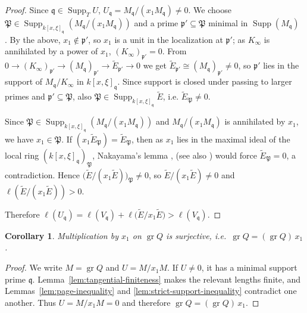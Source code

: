 \documentclass[pdflatex,sn-mathphys-num]{sn-jnl}
\numberwithin{equation}{section}
\theoremstyle{thmstyleone}
\newtheorem{corollary}[theorem]{Corollary}
\theoremstyle{thmstyletwo}
\newcommand{\gr}{\operatorname{gr}}
\begin{document}
\begin{proof}
Since $\mathfrak q\in\operatorname{Supp}_TU$,
$U_{\mathfrak q}=M_{\mathfrak q}/({x_1}M_{\mathfrak q})\ne0$. We choose $\mathfrak P\in\operatorname{Supp}_{k[x,\xi]_{\mathfrak q}}(M_{\mathfrak q}/({x_1}M_{\mathfrak q}))$
and a prime $\mathfrak p'\subseteq\mathfrak P$ minimal in $\operatorname{Supp}(M_{\mathfrak q})$ \cite[Tag 00E0]{Stacks}. By the above, ${x_1}\notin\mathfrak p'$, so ${x_1}$ is a unit in the localization at $\mathfrak p'$; as $K_{\infty}$ is annihilated by a power of ${x_1}$, $(K_{\infty})_{\mathfrak p'}=0$. From
$0\to (K_{\infty})_{\mathfrak p'}\to (M_{\mathfrak q})_{\mathfrak p'}\to \tilde E_{\mathfrak p'}\to0$ we get
$\tilde E_{\mathfrak p'}\cong (M_{\mathfrak q})_{\mathfrak p'}\ne0$, so $\mathfrak p'$ lies in the support of $M_{\mathfrak q}/K_{\infty}$ in $k[x,\xi]_{\mathfrak q}$.
Since support is closed under passing to larger primes \cite[Tag 00L2]{Stacks} and
$\mathfrak p'\subseteq\mathfrak P$, also $\mathfrak P\in\operatorname{Supp}_{k[x,\xi]_{\mathfrak q}}\tilde E$, i.e.
$\tilde E_{\mathfrak P}\ne0$.

Since $\mathfrak P\in\operatorname{Supp}_{k[x,\xi]_{\mathfrak q}}(M_{\mathfrak q}/({x_1}M_{\mathfrak q}))$ and $M_{\mathfrak q}/({x_1}M_{\mathfrak q})$ is annihilated by
${x_1}$, we have ${x_1}\in\mathfrak P$. If $({x_1}\tilde E_{\mathfrak P})=\tilde E_{\mathfrak P}$, then as
${x_1}$ lies in the maximal ideal of the local ring $(k[x,\xi]_{\mathfrak q})_{\mathfrak P}$, Nakayama's lemma \cite{nakayama}, (see also \cite[Tag~00DV]{Stacks})
would force $\tilde E_{\mathfrak P}=0$, a contradiction. Hence
$\bigl(\tilde E/({x_1}\tilde E)\bigr)_{\mathfrak P}\ne0$, so $\tilde E/({x_1}\tilde E)\ne0$ and $\ell\left(\tilde E/({x_1}\tilde E)\right) > 0$.

Therefore $\ell(U_{\mathfrak q})=\ell(V_{\mathfrak q})+\ell\bigl(\tilde E/{x_1}\tilde E\bigr)
>\ell(V_{\mathfrak q})$.
\end{proof}



\begin{corollary} 
\label{cor:Uzero}
Multiplication by $x_1$ on $\operatorname{gr}Q$ is surjective, i.e.\
$\gr Q=(\gr Q)\,x_1$.
\end{corollary}
\begin{proof}
We write $M = \gr Q$ and $U = M/{x_1}M$. If $U\ne0$, it has a minimal support prime $\mathfrak q$.
Lemma~\ref{lem:tangential-finiteness} makes the relevant lengths finite,
and Lemmas~\ref{lem:page-inequality} and
\ref{lem:strict-support-inequality} contradict one another.
Thus $U = M/{x_1}M=0$ and therefore $\gr Q=(\gr Q)\,x_1$.
\end{proof}
\end{document}
